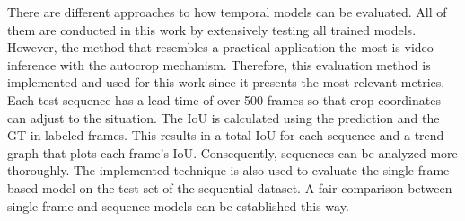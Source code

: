 There are different approaches to how temporal models can be evaluated.
All of them are conducted in this work by extensively testing all trained models.
However, the method that resembles a practical application the most is video inference with the autocrop mechanism.
Therefore, this evaluation method is implemented and used for this work since it presents the most relevant metrics.
Each test sequence has a lead time of over 500 frames so that crop coordinates can adjust to the situation.
The \ac{IoU} is calculated using the prediction and the \ac{GT} in labeled frames.
This results in a total \ac{IoU} for each sequence and a trend graph that plots each frame's \ac{IoU}.
Consequently, sequences can be analyzed more thoroughly.
The implemented technique is also used to evaluate the single-frame-based model on the test set of the sequential dataset.
A fair comparison between single-frame and sequence models can be established this way.